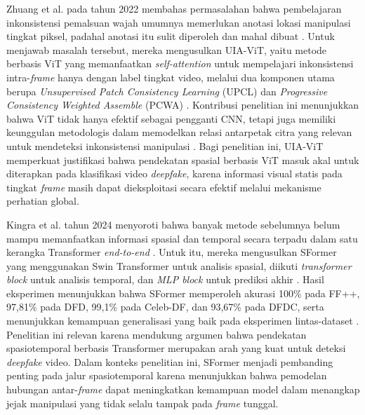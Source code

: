 Zhuang et al. pada tahun 2022 membahas permasalahan bahwa pembelajaran inkonsistensi pemalsuan wajah umumnya memerlukan anotasi lokasi manipulasi tingkat piksel, padahal anotasi itu sulit diperoleh dan mahal dibuat \cite{zhuang2022uiavitunsupervisedinconsistencyawaremethod}. Untuk menjawab masalah tersebut, mereka mengusulkan UIA-ViT, yaitu metode berbasis ViT yang memanfaatkan \textit{self-attention} untuk mempelajari inkonsistensi intra-\textit{frame} hanya dengan label tingkat video, melalui dua komponen utama berupa \textit{Unsupervised Patch Consistency Learning} (UPCL) dan \textit{Progressive Consistency Weighted Assemble} (PCWA) \cite{zhuang2022uiavitunsupervisedinconsistencyawaremethod}. Kontribusi penelitian ini menunjukkan bahwa ViT tidak hanya efektif sebagai pengganti CNN, tetapi juga memiliki keunggulan metodologis dalam memodelkan relasi antarpetak citra yang relevan untuk mendeteksi inkonsistensi manipulasi \cite{zhuang2022uiavitunsupervisedinconsistencyawaremethod}. Bagi penelitian ini, UIA-ViT memperkuat justifikasi bahwa pendekatan spasial berbasis ViT masuk akal untuk diterapkan pada klasifikasi video \textit{deepfake}, karena informasi visual statis pada tingkat \textit{frame} masih dapat dieksploitasi secara efektif melalui mekanisme perhatian global. \par

Kingra et al. tahun 2024 menyoroti bahwa banyak metode sebelumnya belum mampu memanfaatkan informasi spasial dan temporal secara terpadu dalam satu kerangka Transformer \textit{end-to-end} \cite{KINGRA2024301817}. Untuk itu, mereka mengusulkan SFormer yang menggunakan Swin Transformer untuk analisis spasial, diikuti \textit{transformer block} untuk analisis temporal, dan \textit{MLP block} untuk prediksi akhir \cite{KINGRA2024301817}. Hasil eksperimen menunjukkan bahwa SFormer memperoleh akurasi 100\% pada FF++, 97,81\% pada DFD, 99,1\% pada Celeb-DF, dan 93,67\% pada DFDC, serta menunjukkan kemampuan generalisasi yang baik pada eksperimen lintas-dataset \cite{KINGRA2024301817}. Penelitian ini relevan karena mendukung argumen bahwa pendekatan spasiotemporal berbasis Transformer merupakan arah yang kuat untuk deteksi \textit{deepfake} video. Dalam konteks penelitian ini, SFormer menjadi pembanding penting pada jalur spasiotemporal karena menunjukkan bahwa pemodelan hubungan antar-\textit{frame} dapat meningkatkan kemampuan model dalam menangkap jejak manipulasi yang tidak selalu tampak pada \textit{frame} tunggal. \par

